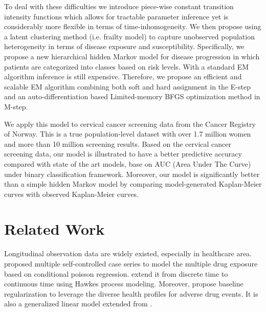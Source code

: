 \documentclass{article}
\begin{document}
To deal with these difficulties we introduce piece-wise constant transition intensity functions which allows for tractable parameter inference yet is considerably more flexible in terms of time-inhomogeneity.  We then propose using a latent clustering method (i.e. frailty model) to capture unobserved population heterogeneity in terms of disease exposure and susceptibility.  Specifically, we propose a new hierarchical hidden Markov model for disease progression in which patients are categorized into classes based on risk levels. With a standard EM algorithm inference is still expensive. Therefore, we propose an efficient and scalable EM algorithm combining both soft and hard assignment in the E-step and an auto-differentiation based Limited-memory BFGS optimization method in M-step. 

We apply this model to cervical cancer screening data from the Cancer Registry of Norway. This is a true population-level dataset with over 1.7 million women and more than 10 million screening results. 
Based on the cervical cancer screening data, our model is illustrated to have a better predictive accuracy compared with state of the art models, base on AUC (Area Under The Curve) under binary classification framework. Moreover, our model is significantly better than a simple hidden Markov model by comparing model-generated Kaplan-Meier curves with observed Kaplan-Meier curves.


\section{Related Work}
Longitudinal observation data are widely existed, especially in healthcare area. \cite{Simpson_2013} proposed multiple self-controlled case series to model the multiple drug exposure based on conditional poisson regression. \cite{Bao_2017} extend it from discrete time to continuous time using Hawkes process modeling. Moreover, \cite{Kuang_2017} propose baseline regularization to leverage the diverse health profiles for adverse drug events. It is also a generalized linear model extended from \cite{Kuang_2016}.
\end{document}
